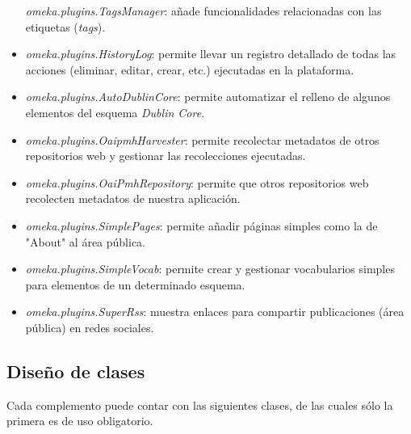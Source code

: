 \begin{itemize}
  \emph{omeka.plugins.TagsManager}: añade funcionalidades relacionadas
  con las etiquetas (\emph{tags}).
\item
  \emph{omeka.plugins.HistoryLog}: permite llevar un registro detallado
  de todas las acciones (eliminar, editar, crear, etc.) ejecutadas en la
  plataforma.
\item
  \emph{omeka.plugins.AutoDublinCore}: permite automatizar el relleno de
  algunos elementos del esquema \emph{Dublin Core}.
\item
  \emph{omeka.plugins.OaipmhHarvester}: permite recolectar metadatos de
  otros repositorios web y gestionar las recolecciones ejecutadas.
\item
  \emph{omeka.plugins.OaiPmhRepository}: permite que otros repositorios
  web recolecten metadatos de nuestra aplicación.
\item
  \emph{omeka.plugins.SimplePages}: permite añadir páginas simples como
  la de "About" al área pública.
\item
  \emph{omeka.plugins.SimpleVocab}: permite crear y gestionar
  vocabularios simples para elementos de un determinado esquema.
\item
  \emph{omeka.plugins.SuperRss}: muestra enlaces para compartir
  publicaciones (área pública) en redes sociales.
\end{itemize}

\subsection{Diseño de clases}

Cada complemento puede contar con las siguientes clases, de las cuales
sólo la primera es de uso obligatorio.

